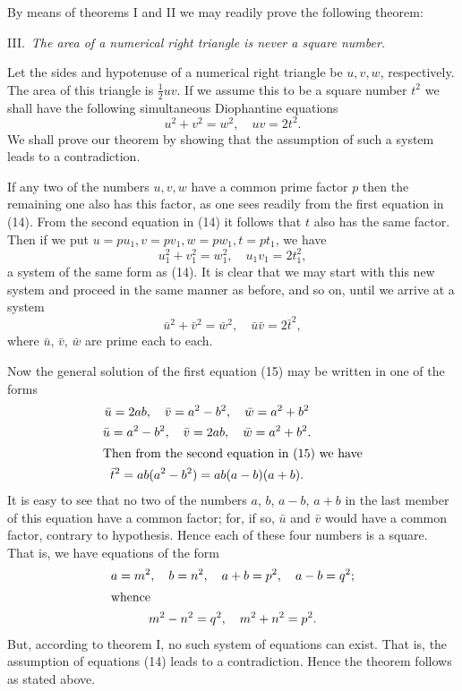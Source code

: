 \documentclass[oneside]{book}
\begin{document}
By means of theorems I and II we may readily prove the following
theorem:

\smallskip III.~\emph{The area of a numerical right triangle is
never a square number.}

Let the sides and hypotenuse of a numerical right triangle be $u, v,
w$, respectively. The area of this triangle is $\frac{1}{2} uv$. If
we assume this to be a square number $t^2$ we shall have the
following simultaneous Diophantine equations
\begin{equation}
u^2 + v^2 = w^2,\quad uv = 2t^2. \tag{14}
\end{equation}
We shall prove our theorem by showing that the assumption of such a
system leads to a contradiction.

If any two of the numbers $u, v, w$ have a common prime factor $p$
then the remaining one also has this factor, as one sees readily
from the first equation in (14). From the second equation in (14) it
follows that $t$ also has the same factor. Then if we put $u = pu_1,
v = pv_1, w = pw_1, t = pt_1$, we have
\begin{equation*}
u_1^2 + v_1^2 = w_1^2,\quad u_1 v_1 = 2t_1^2,
\end{equation*}
a system of the same form as (14). It is clear that we may start
with this new system and proceed in the same manner as before, and
so on, until we arrive at a system
\begin{equation}
\bar{u}^2 + \bar{v}^2 = \bar{w}^2,\quad
  \bar{u}\bar{v} = 2\bar{t}^2, \tag{15}
\end{equation}
where $\bar{u}$, $\bar{v}$, $\bar{w}$ are prime each to each.

Now the general solution of the first equation (15) may be written
in one of the forms
\begin{gather*}
\bar{u} = 2ab,\quad \bar{v} = a^2 - b^2,\quad \bar{w} = a^2 + b^2 \\
\bar{u} = a^2 - b^2,\quad \bar{v} = 2ab, \quad \bar{w} = a^2 + b^2. \\
\intertext{Then from the second equation in (15) we have}
\bar{t}^2 = ab(a^2 - b^2 ) = ab(a-b)(a+b).
\end{gather*}
It is easy to see that no two of the numbers $a$, $b$, $a - b$, $a +
b$ in the last member of this equation have a common factor; for, if
so, $\bar{u}$ and $\bar{v}$ would have a common factor, contrary to
hypothesis. Hence each of these four numbers is a square. That is,
we have equations of the form
\begin{gather*}
a = m^2,\quad b = n^2,\quad a + b = p^2,\quad a - b = q^2; \\
\intertext{whence}
m^2 - n^2 = q^2,\quad m^2 + n^2 = p^2.
\end{gather*}
But, according to theorem I, no such system of equations can exist.
That is, the assumption of equations (14) leads to a contradiction.
Hence the theorem follows as stated above.%
\end{document}
